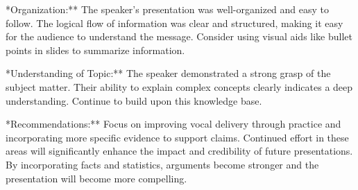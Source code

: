 \documentclass{article}
\begin{document}
\vspace{0.1in}
\noindent **Organization:** The speaker's presentation was well-organized and easy to follow. The logical flow of information was clear and structured, making it easy for the audience to understand the message. Consider using visual aids like bullet points in slides to summarize information.

\vspace{0.1in}
\noindent **Understanding of Topic:** The speaker demonstrated a strong grasp of the subject matter. Their ability to explain complex concepts clearly indicates a deep understanding. Continue to build upon this knowledge base.

\vspace{0.1in}
\noindent **Recommendations:** Focus on improving vocal delivery through practice and incorporating more specific evidence to support claims. Continued effort in these areas will significantly enhance the impact and credibility of future presentations. By incorporating facts and statistics, arguments become stronger and the presentation will become more compelling.
\end{document}
